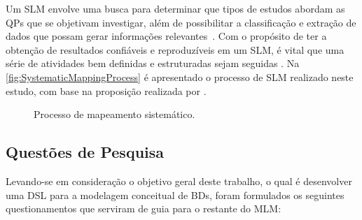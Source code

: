 Um \ac{SLM} envolve uma busca para determinar que tipos de estudos abordam as \acp{QP} que se objetivam investigar, além de possibilitar a classificação e extração de dados que possam gerar informações relevantes~\cite{Bailey:2007}. 
Com o propósito de ter a obtenção de resultados confiáveis e reproduzíveis em um \ac{SLM}, é vital que uma série de atividades bem definidas e estruturadas sejam seguidas \cite{Nakagawa:2017}. 
Na \autoref{fig:SystematicMappingProcess} é apresentado o processo de \ac{SLM} realizado neste estudo, com base na proposição realizada por . %

\begin{figure}[htb]
	\centering
	\caption{Processo de mapeamento sistemático.}
		
	\label{fig:SystematicMappingProcess}
\end{figure}

    \subsection{Questões de Pesquisa} \label{ssec:QPs}

Levando-se em consideração o objetivo geral deste trabalho, o qual é desenvolver uma \ac{DSL} para a modelagem conceitual de \acp{BD}, foram formulados os seguintes questionamentos que serviram de guia para o restante do \ac{MLM}:

